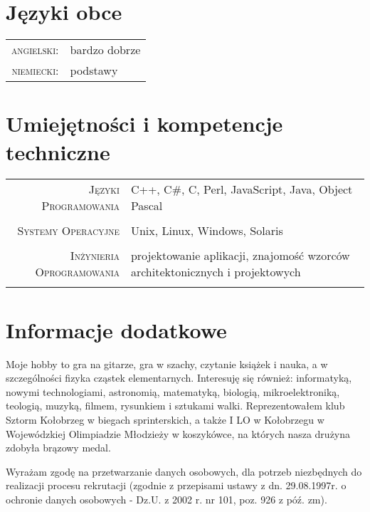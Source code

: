 \documentclass[a4paper,10pt]{article}
\begin{document}
\section{Języki obce}
\begin{tabular}{rl}
	\textsc{angielski:}&bardzo dobrze\\
	\textsc{niemiecki:}&podstawy\\
\end{tabular}

\section{Umiejętności i kompetencje techniczne}
\begin{tabular}{rl}
	\textsc{Języki Programowania}
	&\footnotesize{C++, C\#, C, Perl, JavaScript, Java, Object Pascal} \\
    \multicolumn{2}{c}{} \\
        
    \textsc{Systemy Operacyjne}
    &\footnotesize{Unix, Linux, Windows, Solaris} \\
    \multicolumn{2}{c}{} \\

    \textsc{Inżynieria Oprogramowania}
    &\footnotesize{projektowanie aplikacji, znajomość wzorców architektonicznych i projektowych} \\
    \multicolumn{2}{c}{} \\        
\end{tabular}
	
\section{Informacje dodatkowe}
	Moje hobby to gra na gitarze, gra w szachy, czytanie książek i nauka, a w szczególności fizyka cząstek elementarnych. Interesuję 
	się również: informatyką, nowymi technologiami, astronomią, matematyką, biologią, mikroelektroniką, teologią, muzyką, filmem, 
	rysunkiem i sztukami walki. Reprezentowałem klub Sztorm Kołobrzeg w biegach sprinterskich, a także I LO w Kołobrzegu w Wojewódzkiej 
	Olimpiadzie Młodzieży w koszykówce, na których nasza drużyna zdobyła brązowy medal.
        
    \vfill{}

    \begin{center}
    {\scriptsize Wyrażam zgodę na przetwarzanie danych osobowych, dla potrzeb niezbędnych do realizacji procesu rekrutacji (zgodnie z 
    przepisami ustawy z dn. 29.08.1997r. o ochronie danych osobowych - Dz.U. z 2002 r. nr 101, poz. 926 z póź. zm).}
    \end{center}
	
\end{document}
